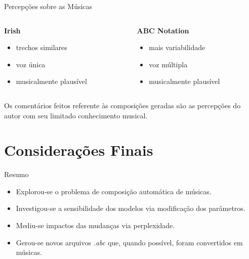 \documentclass[xcolor=table]{beamer}
\begin{document}
    \begin{frame}{Percepções sobre as Músicas}
        \begin{columns}[onlytextwidth,t]
            \begin{column}{0.48\textwidth}
                \centering
                \textbf{Irish}
                \vspace{0.1cm}
                \begin{itemize}
                    \item trechos similares
                    \item voz única
                    \item musicalmente plausível
                \end{itemize}
            \end{column}

            \begin{column}{0.48\textwidth}
                \centering
                \textbf{ABC Notation}
                \vspace{0.1cm}
                \begin{itemize}
                    \item mais variabilidade
                    \item voz múltipla
                    \item musicalmente plausível
                \end{itemize}
            \end{column}
        \end{columns}
        
        \vspace{1cm}
        Os comentários feitos referente às composições geradas são as percepções do autor com seu limitado conhecimento musical.
    \end{frame}



\section{Considerações Finais}
    \begin{frame}{Resumo}
        \begin{itemize}
            \justifying
            \item Explorou-se o problema de composição automática de músicas. 
            \item Investigou-se a sensibilidade dos modelos via modificação dos parâmetros.
            \item Mediu-se impactos das mudanças via perplexidade.
            \item Gerou-se novos arquivos \textit{.abc} que, quando possível, foram convertidos em músicas.
        \end{itemize}
    \end{frame}
    
\end{document}
